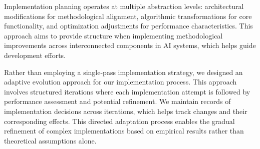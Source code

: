 Implementation planning operates at multiple abstraction levels: architectural modifications for methodological alignment, algorithmic transformations for core functionality, and optimization adjustments for performance characteristics. This approach aims to provide structure when implementing methodological improvements across interconnected components in AI systems, which helps guide development efforts.

Rather than employing a single-pass implementation strategy, we designed an adaptive evolution approach for our implementation process. This approach involves structured iterations where each implementation attempt is followed by performance assessment and potential refinement. We maintain records of implementation decisions across iterations, which helps track changes and their corresponding effects. This directed adaptation process enables the gradual refinement of complex implementations based on empirical results rather than theoretical assumptions alone.